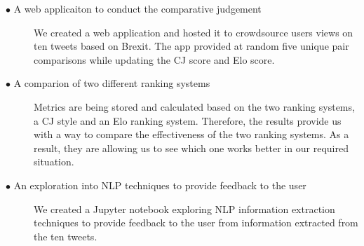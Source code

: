 		\begin{description}	
			
			\item[\(\bullet\) A web applicaiton to conduct the comparative judgement]\hfill
			
			We created a web application and hosted it to crowdsource users views on ten tweets based on Brexit. The app provided at random five unique pair comparisons while updating the CJ score and Elo score. 
			
			\item[\(\bullet\) A comparion of two different ranking systems]\hfill
			
			Metrics are being stored and calculated based on the two ranking systems, a CJ style and an Elo ranking system. Therefore, the results provide us with a way to compare the effectiveness of the two ranking systems. As a result, they are allowing us to see which one works better in our required situation.
			
			\item[\(\bullet\) An exploration into NLP techniques to provide feedback to the user]\hfill
			
			We created a Jupyter notebook exploring NLP information extraction techniques to provide feedback to the user from information extracted from the ten tweets.
			
		\end{description}








